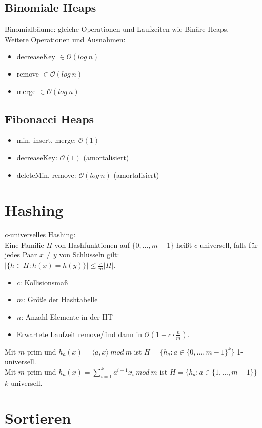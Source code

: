 \documentclass[12pt,a4paper]{article}
\begin{document}
\subsection{Binomiale Heaps}
Binomialbäume: gleiche Operationen und Laufzeiten wie Binäre Heaps.\\
Weitere Operationen und Ausnahmen:
\begin{itemize}
\item decreaseKey $\in\mathcal{O}(log~n)$
\item remove $\in\mathcal{O}(log~n)$
\item merge $\in\mathcal{O}(log~n)$
\end{itemize}
\subsection{Fibonacci Heaps}
\begin{itemize}
\item min, insert, merge: $\mathcal{O}(1)$
\item decreaseKey: $\mathcal{O}(1)$ (amortalisiert)
\item deleteMin, remove: $\mathcal{O}(log~n)$ (amortalisiert)
\end{itemize}
\section{Hashing}
$c$-universelles Hashing:\\
Eine Familie $H$ von Hashfunktionen auf $\{0,...,m-1\}$ heißt $c$-universell, falls für jedes Paar $x\neq y$ von Schlüsseln gilt:\\
$\vert\{ h\in H: h(x)=h(y)\}\vert \leq \frac{c}{m}\vert H\vert$.\\
\begin{itemize}
\item $c$: Kollisionsmaß
\item $m$: Größe der Hashtabelle
\item $n$: Anzahl Elemente in der HT
\item Erwartete Laufzeit remove/find dann in $\mathcal{O}(1+c\cdot\frac{n}{m})$.
\end{itemize}
Mit $m$ prim und $h_a(x)=\langle a,x\rangle ~mod~m$ ist $H=\{h_a:a\in \{0,...,m-1\}^k\}$ 1-universell.\\
Mit $m$ prim und $h_a(x)=\sum_{i=1}^ka^{i-1}x_i ~mod~ m$ ist $H=\{h_a:a\in \{1,...,m-1\}\}$ $k$-universell.
\section{Sortieren}
\end{document}
